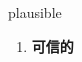 
\begin{frame}
{\huge plausible}
\begin{center}
\begin{enumerate}\Large
  \item \textbf{可信的}
\end{enumerate}
\end{center}
\end{frame}
